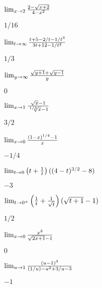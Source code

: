 \begin{exercises}
\begin{exercise} $\lim_{x\to2}{2-\sqrt{x+2}\over 4-x^2}$
\begin{answer} $1/16$
\end{answer}\end{exercise}

\begin{exercise} $\lim_{t\to\infty}{t+5-2/t-1/t^3\over 3t+12-1/t^2}$
\begin{answer} $1/3$
\end{answer}\end{exercise}

\begin{exercise} $\lim_{y\to\infty}{\sqrt{y+1}+\sqrt{y-1}\over y}$
\begin{answer} $0$
\end{answer}\end{exercise}

\begin{exercise} $\lim_{x\to1}{\sqrt{x}-1\over \root 1/3\of{x}-1}$
\begin{answer} $3/2$
\end{answer}\end{exercise}

\begin{exercise} $\lim_{x\to0}{(1-x)^{1/4}-1\over x}$
\begin{answer} $-1/4$
\end{answer}\end{exercise}

\begin{exercise} $\lim_{t\to 0}{\left(t+{1\over t}\right)((4-t)^{3/2}-8)}$
\begin{answer} $-3$
\end{answer}\end{exercise}

\begin{exercise} $\lim_{t\to 0^+}\left({1\over t}+{1\over\sqrt{t}}\right)
(\sqrt{t+1}-1)$
\begin{answer} $1/2$
\end{answer}\end{exercise}

\begin{exercise} $\lim_{x\to 0}{x^2\over\sqrt{2x+1}-1}$
\begin{answer} $0$
\end{answer}\end{exercise}

\begin{exercise} $\lim_{u\to 1}{(u-1)^3\over (1/u)-u^2+3/u-3}$
\begin{answer} $-1$
\end{answer}\end{exercise}


\end{exercises}

